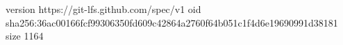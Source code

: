 version https://git-lfs.github.com/spec/v1
oid sha256:36ac00166fcf99306350fd609c42864a2760f64b051c1f4d6e19690991d38181
size 1164
